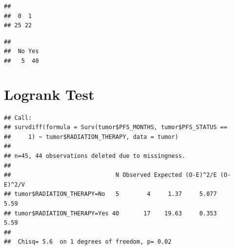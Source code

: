 \documentclass[
  11pt,
]{article}
\newenvironment{Shaded}{\begin{snugshade}}{\end{snugshade}}
\newcommand{\AttributeTok}[1]{\textcolor[rgb]{0.77,0.63,0.00}{#1}}
\newcommand{\DecValTok}[1]{\textcolor[rgb]{0.00,0.00,0.81}{#1}}
\newcommand{\FunctionTok}[1]{\textcolor[rgb]{0.00,0.00,0.00}{#1}}
\newcommand{\NormalTok}[1]{#1}
\newcommand{\OtherTok}[1]{\textcolor[rgb]{0.56,0.35,0.01}{#1}}
\newcommand{\SpecialCharTok}[1]{\textcolor[rgb]{0.00,0.00,0.00}{#1}}
\begin{document}
\begin{Shaded}
\end{Shaded}

\begin{verbatim}
## 
##  0  1 
## 25 22
\end{verbatim}

\begin{Shaded}
\end{Shaded}

\begin{verbatim}
## 
##  No Yes 
##   5  40
\end{verbatim}

\newpage
\section{Logrank Test}

\begin{Shaded}
\end{Shaded}

\begin{verbatim}
## Call:
## survdiff(formula = Surv(tumor$PFS_MONTHS, tumor$PFS_STATUS == 
##     1) ~ tumor$RADIATION_THERAPY, data = tumor)
## 
## n=45, 44 observations deleted due to missingness.
## 
##                              N Observed Expected (O-E)^2/E (O-E)^2/V
## tumor$RADIATION_THERAPY=No   5        4     1.37     5.077      5.59
## tumor$RADIATION_THERAPY=Yes 40       17    19.63     0.353      5.59
## 
##  Chisq= 5.6  on 1 degrees of freedom, p= 0.02
\end{verbatim}
\end{document}
